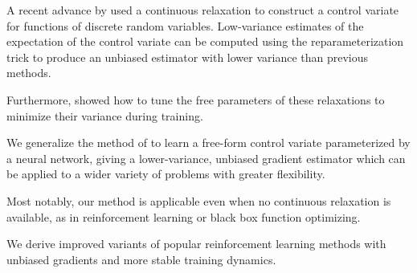 \documentclass{article}
\begin{document}
A recent advance by \citet{tucker2017rebar} used a continuous relaxation to construct a control variate \cite{paisley} for functions of discrete random variables. Low-variance estimates of the expectation of the control variate can be computed using the reparameterization trick to produce an unbiased estimator with lower variance than previous methods.

Furthermore, \citet{tucker2017rebar} showed how to tune the free parameters of these relaxations to minimize their variance during training.

We generalize the method of \citet{tucker2017rebar} to learn a free-form control variate parameterized by a neural network, giving a lower-variance, unbiased gradient estimator which can be applied to a wider variety of problems with greater flexibility.
 
Most notably, our method is applicable even when no continuous relaxation is available, as in reinforcement learning or black box function optimizing.

We derive improved variants of popular reinforcement learning methods with unbiased gradients and more stable training dynamics.

\end{document}
